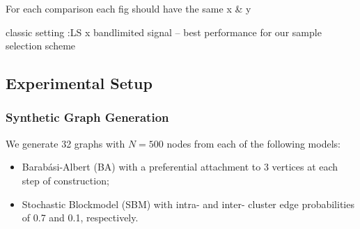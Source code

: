 For each comparison each fig should have the same x \& y

classic setting :LS x bandlimited signal -- best performance for our sample selection scheme

\fi
\subsection{Experimental Setup}
\label{sec:experimental_setup}

\subsubsection{Synthetic Graph Generation}
We generate 32 graphs with $N=500$ nodes from each of the following models:
\begin{itemize}
    \item Barab\'asi-Albert (BA) with a preferential attachment to 3 vertices at each step of construction;
    \item Stochastic Blockmodel (SBM) with intra- and inter- cluster edge probabilities of 0.7 and 0.1, respectively.
\end{itemize}

